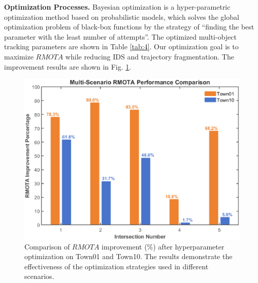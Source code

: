 \documentclass[journal,twoside,web]{ieeecolor}
\begin{document}
\textbf{Optimization Processes.}
Bayesian optimization is a hyper-parametric optimization method based on probabilistic models, which solves the global optimization problem of black-box functions by the strategy of “finding the best parameter with the least number of attempts”.
The optimized multi-object tracking parameters are shown in Table \ref{tab:4}.
Our optimization goal is to maximize \(RMOTA\) while reducing IDS and trajectory fragmentation.
The improvement results are shown in Fig. \ref{fig:4}. 
\begin{figure}[!t]
	\centerline{\includegraphics[width=\columnwidth]{picture/picture4.eps}}
	\caption{Comparison of \(RMOTA\) improvement (\%) after hyperparameter optimization on Town01 and Town10. The results demonstrate the effectiveness of the optimization strategies used in different scenarios.} 
	\label{fig:4} 
\end{figure}
\end{document}
